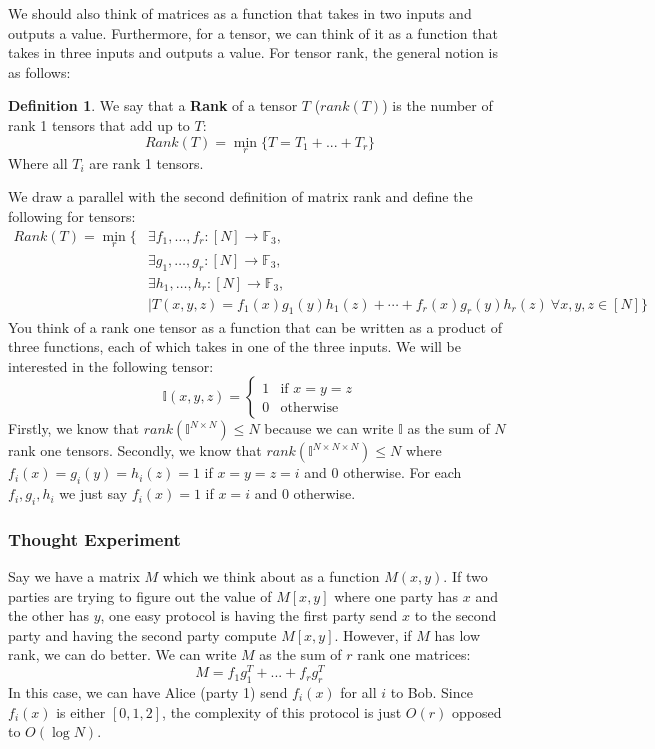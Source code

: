 \documentclass[11pt]{article}
\theoremstyle{definition}
\newtheorem{definition}{Definition}[section]
\begin{document}
We should also think of matrices as a function that takes in two inputs and outputs a value. Furthermore, for a tensor, we can think of it as a function that takes in three inputs and outputs a value. For tensor rank, the general notion is as follows:
\begin{definition}
    We say that a \textbf{Rank} of a tensor $T$ ($rank(T)$) is the number of rank 1 tensors that add up to $T$:
    $$Rank(T) = \underset{r}{\min} \{ T = T_1 + ... + T_r\}$$
    Where all $T_i$ are rank 1 tensors.
\end{definition}
We draw a parallel with the second definition of matrix rank and define the following for tensors:
\begin{align*}
    Rank(T) = \min_{r} \Big\{  &\exists f_1, \ldots, f_r: [N] \longrightarrow \mathbb{F}_3, \\
    &\exists g_1, \ldots, g_r: [N] \longrightarrow \mathbb{F}_3, \\
    &\exists h_1, \ldots, h_r: [N] \longrightarrow \mathbb{F}_3, \\
    &\mid T(x,y,z) = f_1(x) g_1(y) h_1(z) + \cdots + f_r(x) g_r(y) h_r(z)\ \forall x,y,z \in [N]\Big\}
\end{align*}
You think of a rank one tensor as a function that can be written as a product of three functions, each of which takes in one of the three inputs. We will be interested in the following tensor:
$$\mathbb{I}(x,y,z) = \begin{cases}  1 & \text{if } x=y=z\\
0 & \text{otherwise} \end{cases}$$
Firstly, we know that $rank(\mathbb{I}^{N \times N}) \leq N$ because we can write $\mathbb{I}$ as the sum of $N$ rank one tensors. Secondly, we know that $rank(\mathbb{I}^{N \times N \times N}) \leq N$ where $f_i(x) = g_i(y) = h_i(z) = 1$ if $x=y=z=i$ and $0$ otherwise. For each $f_i, g_i, h_i$ we just say $f_i(x) = 1$ if $x=i$ and $0$ otherwise.
\subsubsection{Thought Experiment}
Say we have a matrix $M$ which we think about as a function $M(x,y)$. If two parties are trying to figure out the value of $M[x,y]$ where one party has $x$ and the other has $y$, one easy protocol is having the first party send $x$ to the second party and having the second party compute $M[x,y]$. However, if $M$ has low rank, we can do better. We can write $M$ as the sum of $r$ rank one matrices:
$$M = f_1 g_1^T + ... + f_r g_r^T$$
In this case, we can have Alice (party 1) send $f_i(x)$ for all $i$ to Bob. Since $f_i(x)$ is either $[0,1,2]$, the complexity of this protocol is just $O(r)$ opposed to $O(\log N)$.
\bigskip
\end{document}
